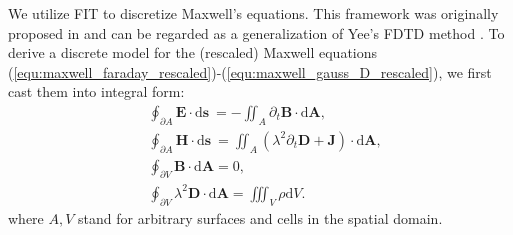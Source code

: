 \documentclass{article}
\begin{document}
We utilize FIT to discretize Maxwell's equations. This framework was originally proposed
in \cite{weiland_1977} and can be regarded as a generalization of Yee's FDTD method
\cite{yee_1966}. To derive a discrete model for the (rescaled) Maxwell equations
(\ref{equ:maxwell_faraday_rescaled})-(\ref{equ:maxwell_gauss_D_rescaled}), we first cast 
them into integral form: 
\begin{subequations}
\begin{align}
    &\oint_{\partial A} \mathbf{E} \cdot \text{d}\mathbf{s} \ = - \iint_A {\partial_t \mathbf{B}} \cdot \text{d}\mathbf{A}, \label{equ:maxwell_int_faraday}\\
    &\oint_{\partial A} \mathbf{H} \cdot \text{d}\mathbf{s} \ = \iint_A \left({\lambda^2\partial_t \mathbf{D}} + \mathbf{J}\right) \cdot \text{d}\mathbf{A}, \label{equ:maxwell_int_ampere}\\
    &\oint_{\partial V} \mathbf{B} \cdot \text{d}\mathbf{A} = 0, \label{equ:maxwell_int_gauss_B}\\
    &\oint_{\partial V} \lambda^2\mathbf{D} \cdot \text{d}\mathbf{A} = \iiint_V \rho \text{d}V. \label{equ:maxwell_int_gauss_D}
\end{align}
\end{subequations}
where $A, V$ stand for arbitrary surfaces and cells in the spatial domain. 
\end{document}

